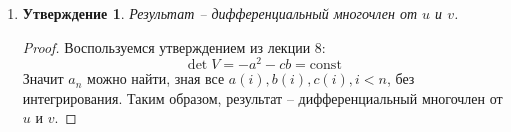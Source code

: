 \documentclass[12pt]{article}
\newtheorem{utv}{Утверждение}
\theoremstyle{definition}
\begin{document}
\begin{itemize}
\begin{enumerate}
\begin{equation}
{        \right)}
        \end{equation}
        \item
        \begin{utv}
            Результат -- дифференциальный многочлен от $u$ и $v$.
        \end{utv}
        \begin{proof}
        Воспользуемся утверждением из лекции 8:
        \begin{equation}
            \det V=-a^2-cb=\text{const}
        \end{equation}
        Значит $a_n$ можно найти, зная все $a(i), b(i), c(i), i<n$, без интегрирования. Таким образом, результат -- дифференциальный многочлен от $u$ и $v$.
        \end{proof}
    \end{enumerate}
\end{itemize}
\end{document}
